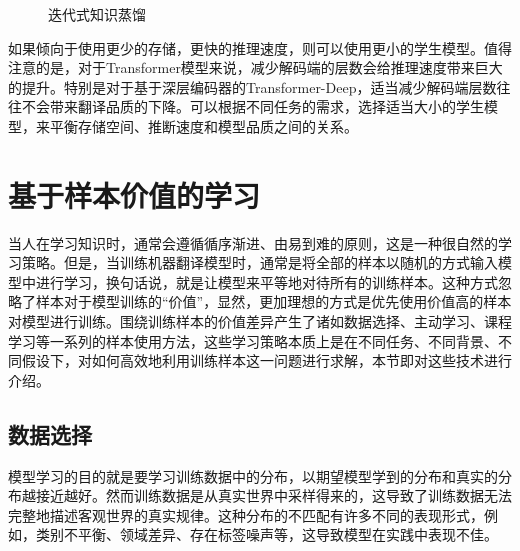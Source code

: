 \begin{figure}[htp]
\centering

\caption{迭代式知识蒸馏}
\label{fig:13-13}
\end{figure}

\parinterval 如果倾向于使用更少的存储，更快的推理速度，则可以使用更小的学生模型。值得注意的是，对于Transformer模型来说，减少解码端的层数会给推理速度带来巨大的提升。特别是对于基于深层编码器的Transformer-Deep，适当减少解码端层数往往不会带来翻译品质的下降。可以根据不同任务的需求，选择适当大小的学生模型，来平衡存储空间、推断速度和模型品质之间的关系。


\sectionnewpage
\section{基于样本价值的学习}

\parinterval 当人在学习知识时，通常会遵循循序渐进、由易到难的原则，这是一种很自然的学习策略。但是，当训练机器翻译模型时，通常是将全部的样本以随机的方式输入模型中进行学习，换句话说，就是让模型来平等地对待所有的训练样本。这种方式忽略了样本对于模型训练的“价值”，显然，更加理想的方式是优先使用价值高的样本对模型进行训练。围绕训练样本的价值差异产生了诸如数据选择、主动学习、课程学习等一系列的样本使用方法，这些学习策略本质上是在不同任务、不同背景、不同假设下，对如何高效地利用训练样本这一问题进行求解，本节即对这些技术进行介绍。


\subsection{数据选择}

\parinterval 模型学习的目的就是要学习训练数据中的分布，以期望模型学到的分布和真实的分布越接近越好。然而训练数据是从真实世界中采样得来的，这导致了训练数据无法完整地描述客观世界的真实规律。这种分布的不匹配有许多不同的表现形式，例如，类别不平衡、领域差异、存在标签噪声等，这导致模型在实践中表现不佳。

